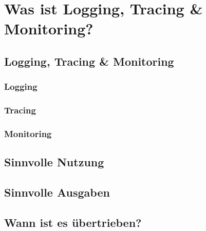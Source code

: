 \chapter{Was ist Logging, Tracing {\selectfont \&} Monitoring?}\label{ch:was-ist-logging-tracing-&-monitoring?}


\section{Logging, Tracing {\selectfont \&} Monitoring}\label{sec:logging-tracing-&-monitoring}

\subsection{Logging}\label{subsec:logging}


\subsection{Tracing}\label{subsec:tracing}

\subsection{Monitoring}\label{subsec:monitoring}


\section{Sinnvolle Nutzung}\label{sec:sinnvolle-nutzung}


\section{Sinnvolle Ausgaben}\label{sec:sinnvolle-ausgaben}


\section{Wann ist es übertrieben?}\label{sec:wann-ist-es-übertrieben?}
